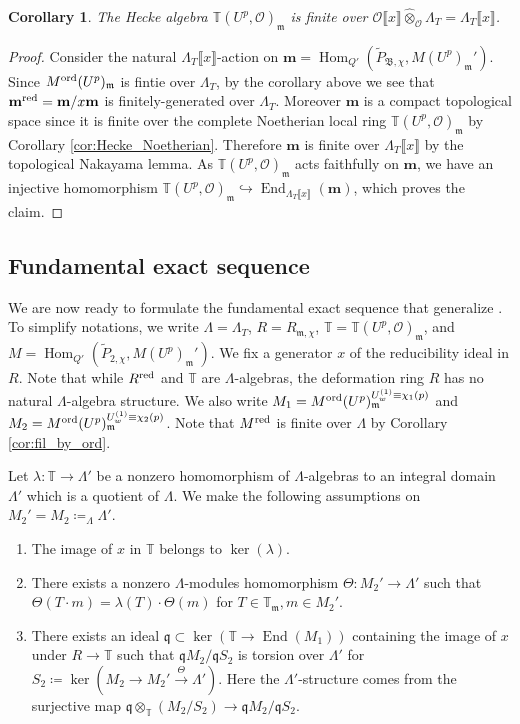 \documentclass[leqno]{amsart}
\newcommand{\TT}{\mathbb{T}} %
\newcommand{\B}{\mathfrak B}
\newcommand{\red}{\textnormal{red}}
\newcommand{\ord}{\textnormal{ord}}
\newcommand{\oo}{\mathcal{O}} %
\newcommand{\fm}{\mathfrak{m}}
\newcommand{\fq}{\mathfrak{q}}
\DeclareMathOperator{\End}{End}
\DeclareMathOperator{\Hom}{Hom}
\newtheorem{cor}[thm]{Corollary}
\theoremstyle{definition}
\theoremstyle{remark}
\begin{document}
\begin{cor}\label{cor:Hecke_finite}
The Hecke algebra 
$\TT(U^p,\oo)_{\fm}$ 
is finite over
$\oo\llbracket x\rrbracket \hat{\otimes}_{\oo}\Lambda_T
=\Lambda_T\llbracket x\rrbracket$.
\end{cor}
\begin{proof}
	Consider the natural
	$\Lambda_T\llbracket x\rrbracket$-action on
	$\mathbf{m}=\Hom_{Q'}(\tilde{P}_{\B,\chi},
	M(U^p)_{\fm}')$.
	Since $M^{\ord}(U^p)_{\fm}$ 
	is fintie over $\Lambda_T$,
	by the corollary above 
	we see that 
	$\mathbf{m}^{\red}=\mathbf{m}/x\mathbf{m}$ 
	is finitely-generated over $\Lambda_T$.
	Moreover $\mathbf{m}$ is a compact 
	topological space 
	since it is finite over  
	the complete Noetherian local ring 
	$\TT(U^p,\oo)_{\fm}$ 
	by Corollary \ref{cor:Hecke_Noetherian}.
	Therefore $\mathbf{m}$
	is finite over $\Lambda_T\llbracket x\rrbracket$
	by the topological Nakayama lemma.
	As $\TT(U^p,\oo)_{\fm}$ acts faithfully
	on $\mathbf{m}$,
	we have an injective homomorphism
	$\TT(U^p,\oo)_{\fm}\hookrightarrow 
	\End_{\Lambda_T\llbracket x\rrbracket}(\mathbf{m})$,
	which proves the claim.
\end{proof}


\subsection{Fundamental exact sequence}

We are now ready to 
formulate the fundamental
exact sequence 
that generalize \cite[Prop 6.3.5]{urban}.
To simplify notations,
we write 
$\Lambda=\Lambda_T$,
$R=R_{\fm,\chi}$,
$\TT=\TT(U^p,\oo)_{\fm}$, and
$M=\Hom_{Q'}(\tilde{P}_{2,\chi},M(U^p)_{\fm}')$.
We fix a generator $x$ of the reducibility
ideal in $R$.
Note that 
while $R^{\red}$ and $\TT$
are  $\Lambda$-algebras,
the deformation ring $R$ 
has no natural $\Lambda$-algebra structure.
We also write
$M_1=M^{\ord}(U^p)_{\fm}^{U_{w}^{(1)}\equiv \chi_1(p)}$
and
$M_2=M^{\ord}(U^p)_{\fm}^{U_{w}^{(1)}\equiv \chi_2(p)}$.
Note that $M^{\red}$ is finite over $\Lambda$
by Corollary \ref{cor:fil_by_ord}.


Let $\lambda\colon \TT\to \Lambda'$
be a nonzero homomorphism of $\Lambda$-algebras
to an integral domain $\Lambda'$
which is a quotient of  $\Lambda$.
We make the following assumptions
on $M_2'=M_2\coloneqq_{\Lambda}\Lambda'$.
\begin{enumerate}[label=(C\roman*)]
\item The image of $x$ in  $\TT$ belongs to  $\ker(\lambda)$.
\item There exists a nonzero 
$\Lambda$-modules homomorphism
$\Theta\colon M_2'\to \Lambda'$  such that 
$\Theta(T\cdot m)=\lambda(T)\cdot \Theta(m)$
for $T\in \TT_{\fm}, m\in M_2'$.

\item There exists an ideal 
$\fq\subset \ker(\TT\to \End(M_1))$
containing the image of $x$ under $R\to \TT$
such that $\fq M_2/\fq S_2$
is torsion over $\Lambda'$ for 
$S_2\coloneqq\ker(M_2\to M_2'\xrightarrow{\Theta}\Lambda')$.
Here the $\Lambda'$-structure comes from the surjective
map  $\fq\otimes_{\TT}(M_2/S_2)\to \fq M_2/\fq S_2$.

\end{enumerate}
\end{document}
